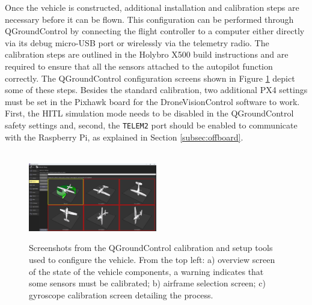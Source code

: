 Once the vehicle is constructed, additional installation and calibration steps are necessary before it can be flown. This configuration can be performed through QGroundControl by connecting the flight controller to a computer either directly via its debug micro-USB port or wirelessly via the telemetry radio.
The calibration steps are outlined in the Holybro X500 build instructions and are required to ensure that all the sensors attached to the autopilot function correctly. The QGroundControl configuration screens shown in Figure \ref{fig:qgc-config} depict some of these steps. Besides the standard calibration, two additional PX4 settings must be set in the Pixhawk board for the DroneVisionControl software to work. First, the HITL simulation mode needs to be disabled in the QGroundControl safety settings and, second, the \texttt{TELEM2} port should be enabled to communicate with the Raspberry Pi, as explained in Section \ref{subsec:offboard}.


\begin{figure}[H]
  \centering
  \\
  \includegraphics[width=0.5\textwidth, keepaspectratio]{img/qgc-config-2.png}
  \caption{Screenshots from the QGroundControl calibration and setup tools used to configure the vehicle. From the top left: a) overview screen of the state of the vehicle components, a warning indicates that some sensors must be calibrated; b) airframe selection screen; c) gyroscope calibration screen detailing the process.}
  \label{fig:qgc-config}
\end{figure}


